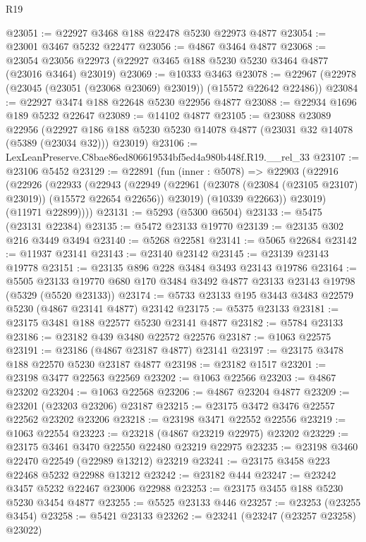 \begin{lexlean}{R19}
\begin{coremodule}
@23051 := @22927 @3468 @188 @22478 @5230 @22973 @4877
@23054 := @23001 @3467 @5232 @22477
@23056 := @4867 @3464 @4877
@23068 := @23054 @23056 @22973 (@22927 @3465 @188 @5230 @5230 @3464 @4877 (@23016 @3464) @23019)
@23069 := @10333 @3463
@23078 := @22967 (@22978 (@23045 (@23051 (@23068 @23069) @23019)) (@15572 @22642 @22486))
@23084 := @22927 @3474 @188 @22648 @5230 @22956 @4877
@23088 := @22934 @1696 @189 @5232 @22647
@23089 := @14102 @4877
@23105 := @23088
    @23089
    @22956
    (@22927 @186 @188 @5230 @5230 @14078 @4877 (@23031 @32 @14078 (@5389 (@23034 @32))) @23019)
@23106 := LexLeanPreserve.C8bae86ed806619534bf5ed4a980b448f.R19.__rel_33
@23107 := @23106 @5452
@23129 := @22891
    (fun (inner : @5078) =>
    @22903
      (@22916
        (@22926
          (@22933
            (@22943
              (@22949
                (@22961 (@23078 (@23084 (@23105 @23107) @23019)) (@15572 @22654 @22656))
                @23019)
              (@10339 @22663))
            @23019)
          (@11971 @22899))))
@23131 := @5293 (@5300 @6504)
@23133 := @5475 (@23131 @22384)
@23135 := @5472 @23133 @19770
@23139 := @23135 @302 @216 @3449 @3494
@23140 := @5268 @22581
@23141 := @5065 @22684
@23142 := @11937 @23141
@23143 := @23140 @23142
@23145 := @23139 @23143 @19778
@23151 := @23135 @896 @228 @3484 @3493 @23143 @19786
@23164 := @5505
    @23133
    @19770
    @680
    @170
    @3484
    @3492
    @4877
    @23133
    @23143
    @19798
    (@5329 (@5520 @23133))
@23174 := @5733 @23133 @195 @3443 @3483 @22579 @5230 (@4867 @23141 @4877) @23142
@23175 := @5375 @23133
@23181 := @23175 @3481 @188 @22577 @5230 @23141 @4877
@23182 := @5784 @23133
@23186 := @23182 @439 @3480 @22572 @22576
@23187 := @1063 @22575
@23191 := @23186 (@4867 @23187 @4877) @23141
@23197 := @23175 @3478 @188 @22570 @5230 @23187 @4877
@23198 := @23182 @1517
@23201 := @23198 @3477 @22563 @22569
@23202 := @1063 @22566
@23203 := @4867 @23202
@23204 := @1063 @22568
@23206 := @4867 @23204 @4877
@23209 := @23201 (@23203 @23206) @23187
@23215 := @23175 @3472 @3476 @22557 @22562 @23202 @23206
@23218 := @23198 @3471 @22552 @22556
@23219 := @1063 @22554
@23223 := @23218 (@4867 @23219 @22975) @23202
@23229 := @23175 @3461 @3470 @22550 @22480 @23219 @22975
@23235 := @23198 @3460 @22470 @22549 (@22989 @13212) @23219
@23241 := @23175 @3458 @223 @22468 @5232 @22988 @13212
@23242 := @23182 @444
@23247 := @23242 @3457 @5232 @22467 @23006 @22988
@23253 := @23175 @3455 @188 @5230 @5230 @3454 @4877
@23255 := @5525 @23133 @446
@23257 := @23253 (@23255 @3454)
@23258 := @5421 @23133
@23262 := @23241 (@23247 (@23257 @23258) @23022)

\end{coremodule}
\end{lexlean}
